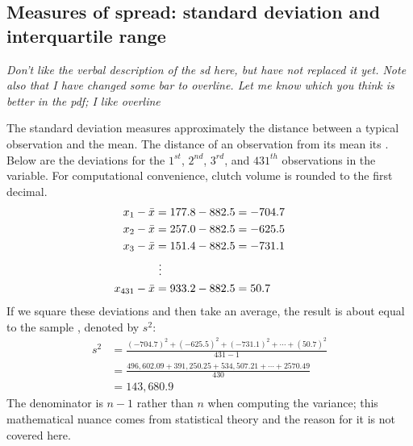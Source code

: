 \begin{doublespace}
\subsection{Measures of spread: standard deviation and interquartile range}
\label{variability}

\textsl{Don't like the verbal description of the sd here, but have not replaced it yet.  Note also that I have changed some bar to overline.  Let me know which you think is better in the pdf; I like overline}

The standard deviation measures approximately the distance between a  typical observation and the mean. The distance of an observation from its mean its . Below are the deviations for the $1^{st}$, $2^{nd}$, $3^{rd}$, and $431^{th}$ observations in the  variable. For computational convenience, clutch volume is rounded to the first decimal.
\begin{align*}
x_1-\bar{x} &= 177.8 - 882.5 = -704.7 \hspace{5mm}\text{ } \\
x_2-\bar{x} &= 257.0 - 882.5 = -625.5 \\
x_3-\bar{x} &= 151.4 - 882.5 = -731.1 \\
&\ \vdots \\
x_{431}-\bar{x} &= 933.2 - 882.5 = 50.7
\end{align*}
If we square these deviations and then take an average, the result is about equal to the sample \label{varianceIsDefined}, denoted by $s^2$:
\begin{align*}
s^2 &= \frac{(-704.7)^2 + (-625.5)^2 + (-731.1)^2 + \cdots + (50.7)^2}{431-1} \\
&= \frac{496,602.09 + 391,250.25 + 534,507.21 + \cdots + 2570.49}{430} \\
&= 143,680.9
\end{align*}
The denominator is $n-1$ rather than $n$ when computing the variance; this mathematical nuance comes from statistical theory and the reason for it is not covered here.


\end{doublespace}
